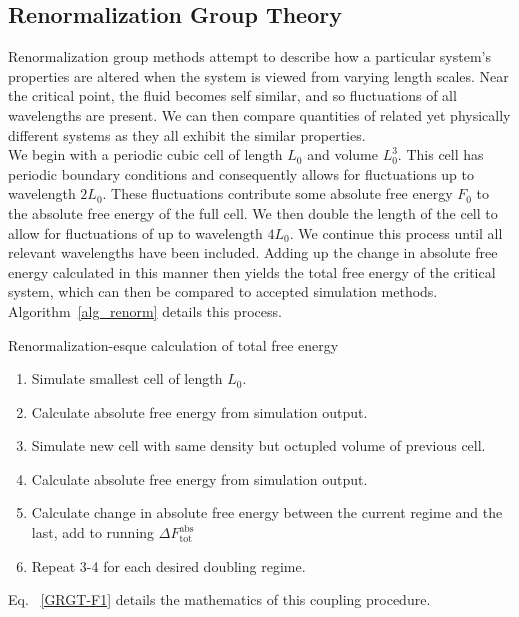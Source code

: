 \documentclass[12pt]{article}
\begin{document}
\subsection{Renormalization Group Theory}
Renormalization group methods attempt to describe how a particular system's properties are altered when the system is viewed from varying length scales. Near the critical point, the fluid becomes self similar, and so fluctuations of all wavelengths are present. We can then compare quantities of related yet physically different systems as they all exhibit the similar properties.\\
We begin with a periodic cubic cell of length $L_0$ and volume $L_0^3$. 
This cell has periodic boundary conditions and consequently allows for fluctuations up to wavelength $2L_0$. These fluctuations contribute some absolute free energy $F_0$ to the absolute free energy of the full cell. We then double the length of the cell to allow for fluctuations of up to wavelength $4L_0$. We continue this process until all relevant wavelengths have been included. Adding up the change in absolute free energy calculated in this manner then yields the total free energy of the critical system, which can then be compared to accepted simulation methods. Algorithm~\ref{alg_renorm} details this process. 

\begin{algorithm}[tb]
    \caption{Renormalization-esque calculation of total free energy}
    \label{alg_renorm}
    \hrulefill
    \begin{enumerate}
        \item Simulate smallest cell of length $L_0$.
        \item Calculate absolute free energy from simulation output.
        \item Simulate new cell with same density but octupled volume of previous cell.
        \item Calculate absolute free energy from simulation output.
        \item Calculate change in absolute free energy between the current regime and the last, add to running $\Delta F^{\text{abs}}_{\text{tot}}$
        \item Repeat 3-4 for each desired doubling regime.
    \end{enumerate}
    \hrulefill
\end{algorithm}

Eq. ~\ref{GRGT-F1} details the mathematics of this coupling procedure.
\end{document}
